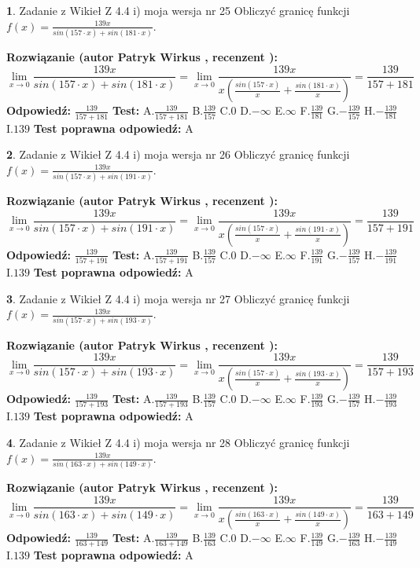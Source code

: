 \documentclass[12pt, a4paper]{article}
\theoremstyle{definition} %
\newtheorem{zad}{}
\newcommand{\zadStart}[1]{\begin{zad}#1\newline}
\newcommand{\zadStop}{\end{zad}}
\newcommand{\rozwStart}[2]{\noindent \textbf{Rozwiązanie (autor #1 , recenzent #2): }\newline}
\newcommand{\rozwStop}{\newline}
\newcommand{\odpStart}{\noindent \textbf{Odpowiedź:}\newline}
\newcommand{\odpStop}{\newline}
\newcommand{\testStart}{\noindent \textbf{Test:}\newline}
\newcommand{\testStop}{\newline}
\newcommand{\kluczStart}{\noindent \textbf{Test poprawna odpowiedź:}\newline}
\newcommand{\kluczStop}{\newline}
\begin{document}
\zadStart{Zadanie z Wikieł Z 4.4 i) moja wersja nr 25}
Obliczyć granicę funkcji $f(x)=\frac{139x}{sin(157\cdot x) +sin(181\cdot x)}$.
\zadStop
\rozwStart{Patryk Wirkus}{}
$$\lim\limits_{x\to 0}\frac{139x}{sin(157\cdot x) +sin(181\cdot x)}=\lim\limits_{x\to 0}\frac{139x}{x(\frac{sin(157\cdot x)}{x}+\frac{sin(181\cdot x)}{x})}=\frac{139}{157+181}$$
\rozwStop
\odpStart
$\frac{139}{157+181}$
\odpStop
\testStart
A.$\frac{139}{157+181}$
B.$\frac{139}{157}$
C.$0$
D.$-\infty$
E.$\infty$
F.$\frac{139}{181}$
G.$-\frac{139}{157}$
H.$-\frac{139}{181}$
I.$139$
\testStop
\kluczStart
A
\kluczStop



\zadStart{Zadanie z Wikieł Z 4.4 i) moja wersja nr 26}
Obliczyć granicę funkcji $f(x)=\frac{139x}{sin(157\cdot x) +sin(191\cdot x)}$.
\zadStop
\rozwStart{Patryk Wirkus}{}
$$\lim\limits_{x\to 0}\frac{139x}{sin(157\cdot x) +sin(191\cdot x)}=\lim\limits_{x\to 0}\frac{139x}{x(\frac{sin(157\cdot x)}{x}+\frac{sin(191\cdot x)}{x})}=\frac{139}{157+191}$$
\rozwStop
\odpStart
$\frac{139}{157+191}$
\odpStop
\testStart
A.$\frac{139}{157+191}$
B.$\frac{139}{157}$
C.$0$
D.$-\infty$
E.$\infty$
F.$\frac{139}{191}$
G.$-\frac{139}{157}$
H.$-\frac{139}{191}$
I.$139$
\testStop
\kluczStart
A
\kluczStop



\zadStart{Zadanie z Wikieł Z 4.4 i) moja wersja nr 27}
Obliczyć granicę funkcji $f(x)=\frac{139x}{sin(157\cdot x) +sin(193\cdot x)}$.
\zadStop
\rozwStart{Patryk Wirkus}{}
$$\lim\limits_{x\to 0}\frac{139x}{sin(157\cdot x) +sin(193\cdot x)}=\lim\limits_{x\to 0}\frac{139x}{x(\frac{sin(157\cdot x)}{x}+\frac{sin(193\cdot x)}{x})}=\frac{139}{157+193}$$
\rozwStop
\odpStart
$\frac{139}{157+193}$
\odpStop
\testStart
A.$\frac{139}{157+193}$
B.$\frac{139}{157}$
C.$0$
D.$-\infty$
E.$\infty$
F.$\frac{139}{193}$
G.$-\frac{139}{157}$
H.$-\frac{139}{193}$
I.$139$
\testStop
\kluczStart
A
\kluczStop



\zadStart{Zadanie z Wikieł Z 4.4 i) moja wersja nr 28}
Obliczyć granicę funkcji $f(x)=\frac{139x}{sin(163\cdot x) +sin(149\cdot x)}$.
\zadStop
\rozwStart{Patryk Wirkus}{}
$$\lim\limits_{x\to 0}\frac{139x}{sin(163\cdot x) +sin(149\cdot x)}=\lim\limits_{x\to 0}\frac{139x}{x(\frac{sin(163\cdot x)}{x}+\frac{sin(149\cdot x)}{x})}=\frac{139}{163+149}$$
\rozwStop
\odpStart
$\frac{139}{163+149}$
\odpStop
\testStart
A.$\frac{139}{163+149}$
B.$\frac{139}{163}$
C.$0$
D.$-\infty$
E.$\infty$
F.$\frac{139}{149}$
G.$-\frac{139}{163}$
H.$-\frac{139}{149}$
I.$139$
\testStop
\kluczStart
A
\kluczStop
\end{document}
